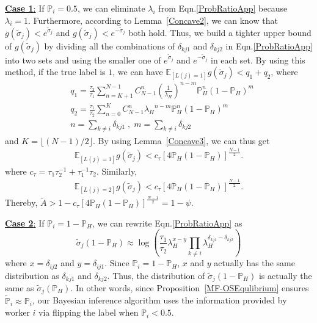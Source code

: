 \documentclass{article}
\begin{document}
\underline{\textbf{Case 1}:} If $\mathbb{P}_i=0.5$, we can eliminate $\lambda_i$ from Eqn.\ref{ProbRatioApp} because $\lambda_i=1$. Furthermore, according to Lemma~\ref{Concave2}, we can know that 
$g(\tilde{\sigma}_j)< e^{\tilde{\sigma}_j}$ and $g(\tilde{\sigma}_j)< e^{-\tilde{\sigma}_j}$ both hold. Thus, we build a tighter upper bound of $g(\tilde{\sigma}_j)$ by dividing all the combinations of $\delta_{kj1}$ and $\delta_{kj2}$ in Eqn.\ref{ProbRatioApp} into two sets and using the smaller one of $e^{\tilde{\sigma}_j}$ and $e^{-\tilde{\sigma}_j}$ in each set.
By using this method, if the true label is $1$, we can have $\mathbb{E}_{[L(j)=1]}g(\tilde{\sigma}_j)< q_1+q_2$, where
\begin{equation*}
\begin{split}
&q_1 = \frac{\tau_2}{\tau_1}{\sum}_{n=K+1}^{N-1}C_{N-1}^{n} (\frac{1}{\lambda_H})^{n-m}\mathbb{P}_H^n(1-\mathbb{P}_H)^m\\
&q_2 = \frac{\tau_1}{\tau_2}{\sum}_{n=0}^{K}C_{N-1}^{n} {\lambda_H}^{n-m}\mathbb{P}_H^n(1-\mathbb{P}_H)^m\\
&n={\sum}_{k\neq i}\delta_{kj1}\;,\;m= {\sum}_{k\neq i}\delta_{kj2}
\end{split}
\end{equation*}
and $K=\lfloor (N-1)/2 \rfloor$. By using Lemma~\ref{Concave3}, we can thus get
\begin{equation*}
\begin{split}
\mathbb{E}_{[L(j)=1]}g(\tilde{\sigma}_j) < c_{\tau}[4\mathbb{P}_H(1-\mathbb{P}_H)]^{\frac{N-1}{2}}.
\end{split}
\end{equation*}
where $c_{\tau}=\tau_1\tau_2^{-1}+\tau_1^{-1}\tau_2$. Similarly,
\begin{equation*}
\begin{split}
\mathbb{E}_{[L(j)=2]}g(\tilde{\sigma}_j) < c_{\tau}[4\mathbb{P}_H(1-\mathbb{P}_H)]^{\frac{N-1}{2}}.
\end{split}
\end{equation*}
Thereby, $\tilde{A}>1-c_{\tau}[4\mathbb{P}_H(1-\mathbb{P}_H)]^{\frac{N-1}{2}}=1-\psi$.


\underline{\textbf{Case 2}:} If $\mathbb{P}_i=1-\mathbb{P}_H$, we can rewrite Eqn.\ref{ProbRatioApp} as
\begin{equation*}
\tilde{\sigma}_j(1-\mathbb{P}_H)\approx \log\left(\frac{\tau_{1}}{\tau_{2}}\lambda_H^{x-y}{\prod}_{k\neq i}\lambda_H^{\delta_{kj1}-\delta_{kj2}}\right)
\end{equation*}
where $x=\delta_{ij2}$ and $y=\delta_{ij1}$. Since $\mathbb{P}_i=1-\mathbb{P}_H$, $x$ and $y$ actually has the same distribution as $\delta_{kj1}$ and $\delta_{kj2}$. Thus, the distribution of $\tilde{\sigma}_j(1-\mathbb{P}_H)$ is actually the same as $\tilde{\sigma}_j(\mathbb{P}_H)$.
In other words, since Proposition~\ref{MF-OSEqulibrium} ensures $\tilde{\mathbb{P}}_i\approx\mathbb{P}_i$, our Bayesian inference algorithm uses the information provided by worker $i$ via flipping the label when $\mathbb{P}_i<0.5$.
\end{document}

